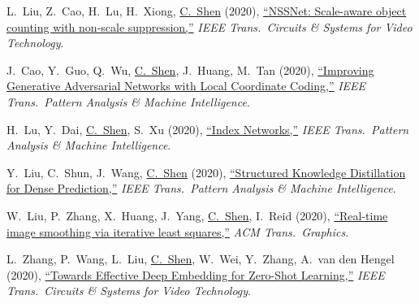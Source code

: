 \documentclass[9pt, a4paper]{article}
\newcommand{\years}[1]{\marginnote{\scriptsize #1}}
\def\highlight{\uline}
\begin{document}
\medskip

\years{2020} L.~Liu, Z.~Cao, H.~Lu, H.~Xiong, \highlight{C.~Shen} (2020),
\href{http://www.google.com/search?lr=&ie=UTF-8&oe=UTF-8&q=NSSNet%3A+Scale-aware+object+counting+with+non-scale+suppression+Liang+Liu%2C+Zhiguo+Cao%2C+Hao+Lu%2C+Haipeng+Xiong%2C+Chunhua+Shen}{``{NSSNet}: Scale-aware object counting with non-scale suppression,{}''}
\emph{IEEE Trans.\  Circuits \& Systems for Video Technology}.

\medskip

\years{2020} J.~Cao, Y.~Guo, Q.~Wu, \highlight{C.~Shen}, J.~Huang, M.~Tan (2020),
\href{http://www.google.com/search?lr=&ie=UTF-8&oe=UTF-8&q=Improving+Generative+Adversarial+Networks+with+Local+Coordinate+Coding+Jiezhang+Cao%2C+Yong+Guo%2C+Qingyao+Wu%2C+Chunhua+Shen%2C+Junzhou+Huang%2C+Mingkui+Tan}{``Improving Generative Adversarial Networks with Local Coordinate Coding,{}''}
\emph{IEEE Trans.\  Pattern Analysis \& Machine Intelligence}.

\medskip

\years{2020} H.~Lu, Y.~Dai, \highlight{C.~Shen}, S.~Xu (2020),
\href{http://www.google.com/search?lr=&ie=UTF-8&oe=UTF-8&q=Index+Networks+Hao+Lu%2C+Yutong+Dai%2C+Chunhua+Shen%2C+Songcen+Xu}{``Index Networks,{}''}
\emph{IEEE Trans.\  Pattern Analysis \& Machine Intelligence}.

\medskip

\years{2020} Y.~Liu, C.~Shun, J.~Wang, \highlight{C.~Shen} (2020),
\href{http://www.google.com/search?lr=&ie=UTF-8&oe=UTF-8&q=Structured+Knowledge+Distillation+for+Dense+Prediction+Yifan+Liu%2C+Changyong+Shun%2C+Jingdong+Wang%2C+Chunhua+Shen}{``Structured Knowledge Distillation for Dense Prediction,{}''}
\emph{IEEE Trans.\  Pattern Analysis \& Machine Intelligence}.

\medskip

\years{2020} W.~Liu, P.~Zhang, X.~Huang, J.~Yang, \highlight{C.~Shen}, I.~Reid (2020),
\href{http://www.google.com/search?lr=&ie=UTF-8&oe=UTF-8&q=Real-time+image+smoothing+via+iterative+least+squares+Wei+Liu%2C+Pingping+Zhang%2C+Xiaolin+Huang%2C+Jie+Yang%2C+Chunhua+Shen%2C+Ian+Reid}{``Real-time image smoothing via iterative least squares,{}''}
\emph{ACM Trans.\  Graphics}.

\medskip

\years{2020} L.~Zhang, P.~Wang, L.~Liu, \highlight{C.~Shen}, W.~Wei, Y.~Zhang, A.~van den Hengel (2020),
\href{http://www.google.com/search?lr=&ie=UTF-8&oe=UTF-8&q=Towards+Effective+Deep+Embedding+for+Zero-Shot+Learning+Lei+Zhang%2C+Peng+Wang%2C+Lingqiao+Liu%2C+Chunhua+Shen%2C+Wei+Wei%2C+Yanning+Zhang%2C+Anton+van+den+Hengel}{``Towards Effective Deep Embedding for Zero-Shot Learning,{}''}
\emph{IEEE Trans.\  Circuits \& Systems for Video Technology}.
\end{document}
